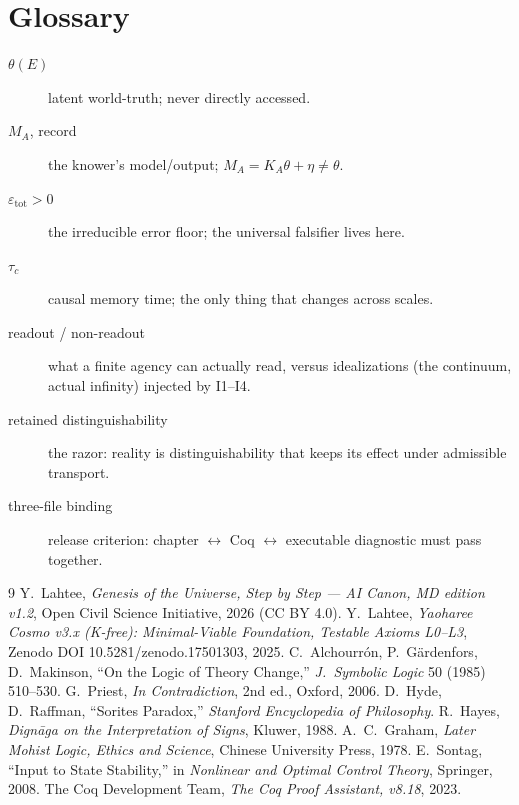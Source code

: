 \documentclass[11pt,a4paper,twoside]{book}
\theoremstyle{plain}
\theoremstyle{definition}
\theoremstyle{remark}
\begin{document}
\chapter{Glossary}
\begin{description}
\item[$\theta(E)$] latent world-truth; never directly accessed.
\item[$M_A$, record] the knower's model/output; $M_A = K_A\theta + \eta \ne \theta$.
\item[$\varepsilon_{\mathrm{tot}}>0$] the irreducible error floor; the universal falsifier lives here.
\item[$\tau_c$] causal memory time; the only thing that changes across scales.
\item[readout / non-readout] what a finite agency can actually read, versus
  idealizations (the continuum, actual infinity) injected by I1--I4.
\item[retained distinguishability] the razor: reality is distinguishability
  that keeps its effect under admissible transport.
\item[three-file binding] release criterion: chapter $\leftrightarrow$ Coq
  $\leftrightarrow$ executable diagnostic must pass together.
\end{description}

\begin{thebibliography}{9}
 Y.~Lahtee, \emph{Genesis of the Universe, Step by Step ---
AI Canon, MD edition v1.2}, Open Civil Science Initiative, 2026 (CC BY 4.0).
 Y.~Lahtee, \emph{Yaoharee Cosmo v3.x (K-free): Minimal-Viable
Foundation, Testable Axioms L0--L3}, Zenodo DOI 10.5281/zenodo.17501303, 2025.
 C.~Alchourr\'on, P.~G\"ardenfors, D.~Makinson, ``On the Logic of
Theory Change,'' \emph{J.\ Symbolic Logic} 50 (1985) 510--530.
 G.~Priest, \emph{In Contradiction}, 2nd ed., Oxford, 2006.
 D.~Hyde, D.~Raffman, ``Sorites Paradox,''
\emph{Stanford Encyclopedia of Philosophy}.
 R.~Hayes, \emph{Dign\=aga on the Interpretation of Signs},
Kluwer, 1988.
 A.~C.~Graham, \emph{Later Mohist Logic, Ethics and Science},
Chinese University Press, 1978.
 E.~Sontag, ``Input to State Stability,'' in \emph{Nonlinear
and Optimal Control Theory}, Springer, 2008.
 The Coq Development Team, \emph{The Coq Proof Assistant,
v8.18}, 2023.
\end{thebibliography}
\end{document}
